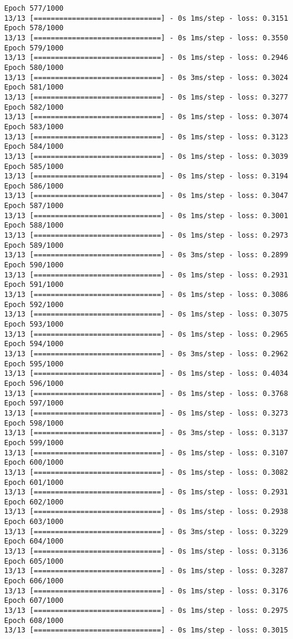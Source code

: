 \documentclass[11pt]{article}
\begin{document}
\begin{Verbatim}[commandchars=\\\{\}]
Epoch 577/1000
13/13 [==============================] - 0s 1ms/step - loss: 0.3151
Epoch 578/1000
13/13 [==============================] - 0s 1ms/step - loss: 0.3550
Epoch 579/1000
13/13 [==============================] - 0s 1ms/step - loss: 0.2946
Epoch 580/1000
13/13 [==============================] - 0s 3ms/step - loss: 0.3024
Epoch 581/1000
13/13 [==============================] - 0s 1ms/step - loss: 0.3277
Epoch 582/1000
13/13 [==============================] - 0s 1ms/step - loss: 0.3074
Epoch 583/1000
13/13 [==============================] - 0s 1ms/step - loss: 0.3123
Epoch 584/1000
13/13 [==============================] - 0s 1ms/step - loss: 0.3039
Epoch 585/1000
13/13 [==============================] - 0s 1ms/step - loss: 0.3194
Epoch 586/1000
13/13 [==============================] - 0s 1ms/step - loss: 0.3047
Epoch 587/1000
13/13 [==============================] - 0s 1ms/step - loss: 0.3001
Epoch 588/1000
13/13 [==============================] - 0s 1ms/step - loss: 0.2973
Epoch 589/1000
13/13 [==============================] - 0s 3ms/step - loss: 0.2899
Epoch 590/1000
13/13 [==============================] - 0s 1ms/step - loss: 0.2931
Epoch 591/1000
13/13 [==============================] - 0s 1ms/step - loss: 0.3086
Epoch 592/1000
13/13 [==============================] - 0s 1ms/step - loss: 0.3075
Epoch 593/1000
13/13 [==============================] - 0s 1ms/step - loss: 0.2965
Epoch 594/1000
13/13 [==============================] - 0s 3ms/step - loss: 0.2962
Epoch 595/1000
13/13 [==============================] - 0s 1ms/step - loss: 0.4034
Epoch 596/1000
13/13 [==============================] - 0s 1ms/step - loss: 0.3768
Epoch 597/1000
13/13 [==============================] - 0s 1ms/step - loss: 0.3273
Epoch 598/1000
13/13 [==============================] - 0s 3ms/step - loss: 0.3137
Epoch 599/1000
13/13 [==============================] - 0s 1ms/step - loss: 0.3107
Epoch 600/1000
13/13 [==============================] - 0s 1ms/step - loss: 0.3082
Epoch 601/1000
13/13 [==============================] - 0s 1ms/step - loss: 0.2931
Epoch 602/1000
13/13 [==============================] - 0s 1ms/step - loss: 0.2938
Epoch 603/1000
13/13 [==============================] - 0s 3ms/step - loss: 0.3229
Epoch 604/1000
13/13 [==============================] - 0s 1ms/step - loss: 0.3136
Epoch 605/1000
13/13 [==============================] - 0s 1ms/step - loss: 0.3287
Epoch 606/1000
13/13 [==============================] - 0s 1ms/step - loss: 0.3176
Epoch 607/1000
13/13 [==============================] - 0s 1ms/step - loss: 0.2975
Epoch 608/1000
13/13 [==============================] - 0s 1ms/step - loss: 0.3015

\end{Verbatim}
\end{document}
